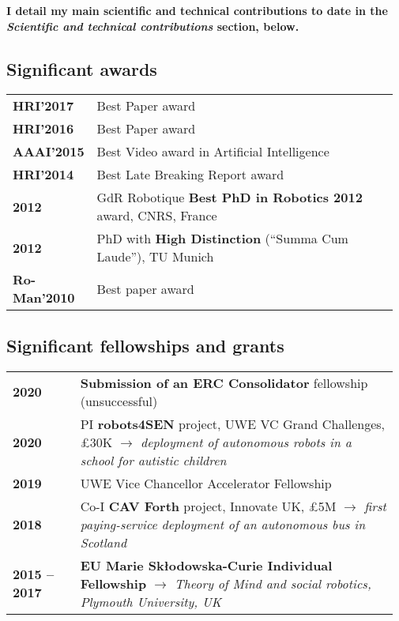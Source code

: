 {\bf I detail my main scientific and technical contributions to date in the
\emph{Scientific and technical contributions} section, below.}


\subsection{Significant awards}

\begin{tabular}{p{0.17\linewidth}p{0.8\linewidth}}
    \bf HRI'2017  & Best Paper award\\
    \bf HRI'2016  & Best Paper award\\
    \bf AAAI'2015  & Best Video award in Artificial Intelligence\\
    \bf HRI'2014  & Best Late Breaking Report award\\
    \bf 2012         & GdR Robotique {\bf Best PhD in Robotics 2012} award, CNRS, France \\
    \bf 2012         & PhD with {\bf High Distinction} (“Summa Cum Laude”), TU Munich\\
    \bf Ro-Man'2010  & Best paper award\\
\end{tabular}

\subsection{Significant fellowships and grants}

\begin{tabular}{p{0.17\linewidth}p{0.8\linewidth}}
    \bf 2020 & \textbf{Submission of an ERC Consolidator} fellowship (unsuccessful) \\
    \bf 2020 & PI \textbf{robots4SEN} project, UWE VC Grand Challenges, £30K
               \newline \emph{$\rightarrow$ deployment of autonomous robots in a school for autistic
               children}\\
    \bf 2019 & UWE Vice Chancellor Accelerator Fellowship \\
    \bf 2018 & Co-I \textbf{CAV Forth} project, Innovate UK, £5M 
               \newline \emph{$\rightarrow$ first paying-service deployment of an
               autonomous bus in Scotland}\\
    \bf 2015 -- 2017 & {\bf EU Marie Skłodowska-Curie Individual Fellowship}
    \newline \emph{$\rightarrow$ Theory of Mind and social robotics, Plymouth University, UK} \\
\end{tabular}

